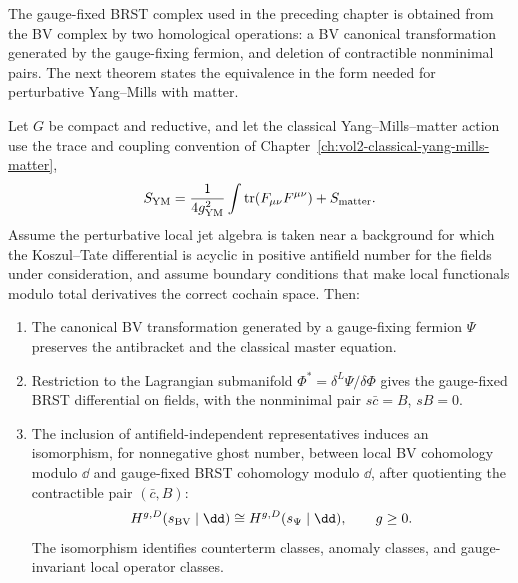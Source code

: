 The gauge-fixed BRST complex used in the preceding chapter is obtained from
the BV complex by two homological operations: a BV canonical transformation
generated by the gauge-fixing fermion, and deletion of contractible
nonminimal pairs.  The next theorem states the equivalence in the form needed
for perturbative Yang--Mills with matter.

\begin{theorem}
\label{thm:bv-brst-local-comparison-ym}
Let \(G\) be compact and reductive, and let the classical Yang--Mills--matter
action use the trace and coupling convention of
Chapter~\ref{ch:vol2-classical-yang-mills-matter},
\[
  S_{\rm YM}=\frac1{4g_{\rm YM}^2}\int\operatorname{tr}(F_{\mu\nu}F^{\mu\nu})
  +S_{\rm matter}.
\]
Assume the perturbative local jet algebra is taken near a background for
which the Koszul--Tate differential is acyclic in positive antifield number
for the fields under consideration, and assume boundary conditions that make
local functionals modulo total derivatives the correct cochain space.  Then:
\begin{enumerate}
\item The canonical BV transformation generated by a gauge-fixing fermion
\(\Psi\) preserves the antibracket and the classical master equation.
\item Restriction to the Lagrangian submanifold
\(\Phi^*=\delta^L\Psi/\delta\Phi\) gives the gauge-fixed BRST differential on
fields, with the nonminimal pair \(s\bar c=B\), \(sB=0\).
\item The inclusion of antifield-independent representatives induces an
isomorphism, for nonnegative ghost number, between local BV cohomology modulo
\(\dd\) and gauge-fixed BRST cohomology modulo \(\dd\), after quotienting the
contractible pair \((\bar c,B)\):
\[
  H^{g,D}(s_{\rm BV}\mid\dd)
  \cong
  H^{g,D}(s_{\Psi}\mid\dd),
  \qquad g\ge0 .
\]
The isomorphism identifies counterterm classes, anomaly classes, and
gauge-invariant local operator classes.
\end{enumerate}
\end{theorem}

